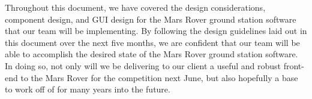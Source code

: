 Throughout this document, we have covered the design considerations, component design, and GUI design for the Mars Rover ground station software that our team will be implementing.
By following the design guidelines laid out in this document over the next five months, we are confident that our team will be able to accomplish the desired state of the Mars Rover ground station software.
In doing so, not only will we be delivering to our client a useful and robust front-end to the Mars Rover for the competition next June, but also hopefully a base to work off of for many years into the future.